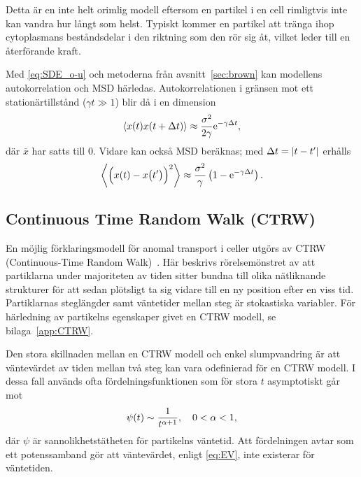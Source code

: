 Detta är en inte helt orimlig modell eftersom en partikel i en cell rimligtvis inte kan vandra hur långt som helst. Typiskt kommer en partikel att tränga ihop cytoplasmans beståndsdelar i den riktning som den rör sig åt, vilket leder till en återförande kraft.

Med \eqref{eq:SDE_o-u} och metoderna från avsnitt~\ref{sec:brown} kan modellens autokorrelation och MSD härledas. Autokorrelationen i gränsen mot ett stationärtillstånd ($\gamma t\gg 1$) blir då i en dimension
\begin{equation}\label{eq:COV_o-u}
\ev{x(t)x(t+\Delta{t})} \approx \frac{\sigma^2}{2\gamma} \ee^{-\gamma\Delta{t}},
\end{equation}
där $\bar{x}$ har satts till 0. Vidare kan också MSD beräknas; med $\Delta{t}=\abs{t-t'}$ erhålls
\begin{equation}\label{eq:MSD_o-u}
\ev{\Big(x(t)-x\big(t'\big) \Big)^2} 
\approx \frac{\sigma^2}{\gamma} \left( 1-\ee^{-\gamma \Delta{t}} \right).
\end{equation}



\subsection{Continuous Time Random Walk (CTRW)}
En möjlig förklaringsmodell för anomal transport i celler utgörs av CTRW (Continuous-Time Random Walk)~\cite{Hofling&Franosch2013}. Här beskrivs rörelsemönstret av att partiklarna under majoriteten av tiden sitter bundna till olika nätliknande strukturer för att sedan plötsligt ta sig vidare till en ny position efter en viss tid. Partiklarnas steglängder samt väntetider mellan steg är stokastiska variabler. För härledning av partikelns egenskaper givet en CTRW modell, se bilaga~\ref{app:CTRW}. 

Den stora skillnaden mellan en CTRW modell och enkel slumpvandring är att väntevärdet av tiden mellan två steg kan vara odefinierad för en CTRW modell. I dessa fall används ofta \cite{Hofling&Franosch2013} fördelningsfunktionen som för stora $t$ asymptotiskt går mot
\begin{equation}
\psi(t) \sim \frac{1}{t^{\alpha+1}}\qcomma 0<\alpha<1,
\end{equation}
där $\psi$ är sannolikhetstätheten för partikelns väntetid. Att fördelningen avtar som ett potenssamband gör att väntevärdet, enligt \eqref{eq:EV}, inte existerar för väntetiden.

